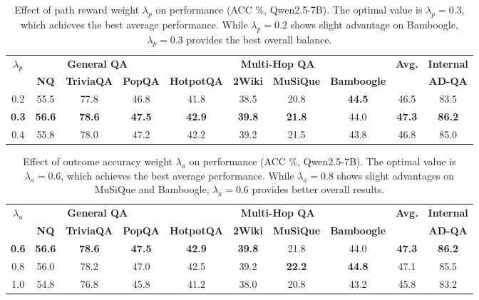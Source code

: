\documentclass[11pt]{article}
\begin{document}
\begin{table}[h]
\centering
\small
\begin{tabular}{c|ccc|cccc|c|c}
\toprule
\multirow{2}{*}{\textbf{$\lambda_p$}} & \multicolumn{3}{c|}{\textbf{General QA}} & \multicolumn{4}{c|}{\textbf{Multi-Hop QA}} & \multirow{2}{*}{\textbf{Avg.}} & \textbf{Internal} \\
& \textbf{NQ} & \textbf{TriviaQA} & \textbf{PopQA} & \textbf{HotpotQA} & \textbf{2Wiki} & \textbf{MuSiQue} & \textbf{Bamboogle} & & \textbf{AD-QA} \\
\midrule
0.2 & 55.5 & 77.8 & 46.8 & 41.8 & 38.5 & 20.8 & \textbf{44.5} & 46.5 & 83.5 \\
\textbf{0.3} & \textbf{56.6} & \textbf{78.6} & \textbf{47.5} & \textbf{42.9} & \textbf{39.8} & \textbf{21.8} & 44.0 & \textbf{47.3} & \textbf{86.2} \\
0.4 & 55.8 & 78.0 & 47.2 & 42.2 & 39.2 & 21.5 & 43.8 & 46.8 & 85.0 \\
\bottomrule
\end{tabular}
\caption{Effect of path reward weight $\lambda_p$ on performance (ACC \%, Qwen2.5-7B). The optimal value is $\lambda_p = 0.3$, which achieves the best average performance. While $\lambda_p = 0.2$ shows slight advantage on Bamboogle, $\lambda_p = 0.3$ provides the best overall balance.}
\label{tab:lambda_p_detailed}
\end{table}

\begin{table}[h]
\centering
\small
\begin{tabular}{c|ccc|cccc|c|c}
\toprule
\multirow{2}{*}{\textbf{$\lambda_a$}} & \multicolumn{3}{c|}{\textbf{General QA}} & \multicolumn{4}{c|}{\textbf{Multi-Hop QA}} & \multirow{2}{*}{\textbf{Avg.}} & \textbf{Internal} \\
& \textbf{NQ} & \textbf{TriviaQA} & \textbf{PopQA} & \textbf{HotpotQA} & \textbf{2Wiki} & \textbf{MuSiQue} & \textbf{Bamboogle} & & \textbf{AD-QA} \\
\midrule
\textbf{0.6} & \textbf{56.6} & \textbf{78.6} & \textbf{47.5} & \textbf{42.9} & \textbf{39.8} & 21.8 & 44.0 & \textbf{47.3} & \textbf{86.2} \\
0.8 & 56.0 & 78.2 & 47.0 & 42.5 & 39.2 & \textbf{22.2} & \textbf{44.8} & 47.1 & 85.5 \\
1.0 & 54.8 & 76.8 & 45.8 & 41.2 & 38.0 & 20.8 & 43.2 & 45.8 & 83.2 \\
\bottomrule
\end{tabular}
\caption{Effect of outcome accuracy weight $\lambda_a$ on performance (ACC \%, Qwen2.5-7B). The optimal value is $\lambda_a = 0.6$, which achieves the best average performance. While $\lambda_a = 0.8$ shows slight advantages on MuSiQue and Bamboogle, $\lambda_a = 0.6$ provides better overall results.}
\label{tab:lambda_a_detailed}
\end{table}
\end{document}
